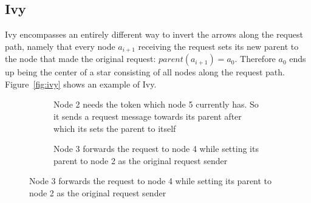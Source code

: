 \documentclass[a4paper, oneside]{discothesis}
\begin{document}
\subsection{Ivy}
\label{intro:ivy}

Ivy encompasses an entirely different way to invert the arrows along the request path, namely that every node $a_{i+1}$ receiving the request sets its new parent to the node that made the original request: $parent(a_{i+1})=a_{0}$. Therefore $a_{0}$ ends up being the center of a star consisting of all nodes along the request path. Figure~\ref{fig:ivy} shows an example of Ivy.

\begin{figure}[H]
\begin{subfigure}[t]{0.5\textwidth}
\centering
{}
\caption{Node 2 needs the token which node 5 currently has. So it sends a request message towards its parent after which its sets the parent to itself}
\end{subfigure}
\quad
\begin{subfigure}[t]{0.5\textwidth}
\centering
{}
\caption{Node 3 forwards the request to node 4 while setting its parent to node 2 as the original request sender}
\end{subfigure}


\end{figure}
\end{document}
